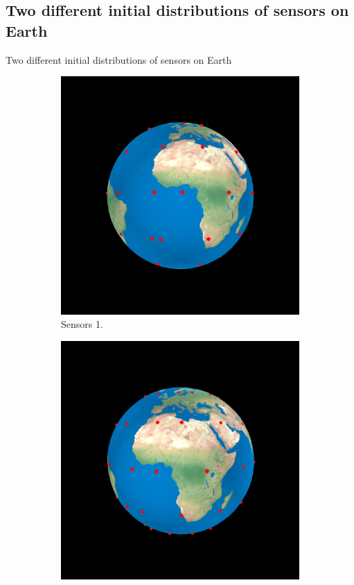 \documentclass{beamer}
\begin{document}
\subsection{Two different initial distributions of sensors on Earth}
\begin{frame}{Two different initial distributions of sensors on Earth}

\begin{figure}[!ht]
	\centering
	\begin{subfigure}{.5\textwidth}
		\centering
		\includegraphics[scale=0.15]{used_images/sensors01.png}
		\caption{Sensors 1.}
	\end{subfigure}%
	\begin{subfigure}{.5\textwidth}
		\centering
		\includegraphics[scale=0.1502]{used_images/sensors02.png}

\end{subfigure}
\end{figure}
\end{frame}
\end{document}
